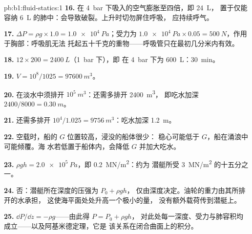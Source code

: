 \begin{solution}{pb:b1:fluid-statics:1}
\textbf{16.} 在 \qty{4}{bar} 下吸入的空气膨胀至四倍，即 \qty{24}{L}，
置于仅能容纳 \qty{6}{L} 的肺中：会导致破裂。上升时切勿屏住呼吸，
应持续呼气。

\textbf{17.} $\Delta P = \rho g \times 1.0 = \qty{1.0e4}{Pa}$；受力为 $\qty{1.0e4}{Pa}
\times 0.05 = \qty{500}{N}$，作用于胸部：呼吸肌无法
托起五十千克的重物——呼吸管只在最初几分米内有效。

\textbf{18.} $12 \times 200 = \qty{2400}{L}$（\qty{1}{bar} 下），即
在 \qty{4}{bar} 下为 \qty{600}{L}：\qty{30}{min}。

\textbf{19.} $V = 10^8/1025 = \qty{97600}{m^3}$。

\textbf{20.} 在淡水中须排开 $10^5\ \unit{m^3}$：还需多排开 \qty{2400}{m^3}，
即吃水加深 $2400/8000 = \qty{0.30}{m}$。

\textbf{21.} 还需多排开 $10^4/1.025 = \qty{9756}{m^3}$：吃水加深 \qty{1.2}{m}。

\textbf{22.} 空载时，船的 $G$ 位置较高，浸没的船体很少：
稳心可能低于 $G$，船在涌浪中可能倾覆。海
水若低置于船体内，会降低 $G$ 并加大吃水。

\textbf{23.} $\rho gh = \qty{2.0e5}{Pa}$，即 \qty{0.2}{MN/m^2}：约为
潜艇所受 \qty{3}{MN/m^2} 的十五分之一。

\textbf{24.} 否：潜艇所在深度的压强为 $P_0 + \rho gh$，
仅由深度决定。油轮的重力由其所排开的水承担，
这使海平面处处升高一个极小的量，
没有额外载荷传到潜艇上。

\textbf{25.} $\dd P/\dd z = -\rho g$——由此得 $P = P_0 + \rho gh$，
对此处每一深度、受力与肺容积均成立——以及阿基米德定理，它是
该关系在闭合曲面上的积分。
\end{solution}

